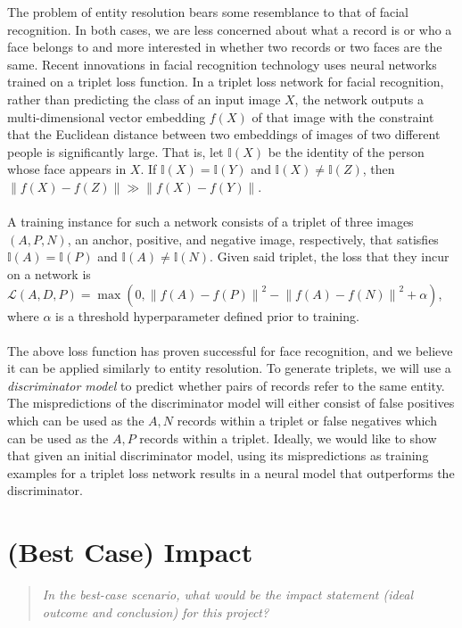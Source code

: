 \documentclass{proc}
\begin{document}
The problem of entity resolution bears some resemblance to that of facial recognition. In both cases, we are less concerned about what a record is or who a face belongs to and more interested in whether two records or two faces are the same. Recent innovations in facial recognition technology uses neural networks trained on a triplet loss function. In a triplet loss network for facial recognition, rather than predicting the class of an input image $X$, the network outputs a multi-dimensional vector embedding $f(X)$ of that image with the constraint that the Euclidean distance between two embeddings of images of two different people is significantly large. That is, let $\mathbb{I}(X)$ be the identity of the person whose face appears in $X$. If $\mathbb{I}(X) = \mathbb{I}(Y)$ and $\mathbb{I}(X) \neq \mathbb{I}(Z)$, then $\left\|f(X) - f(Z) \right\|  \gg \left\|f(X) - f(Y) \right\|$.
\\\\
A training instance for such a network consists of a triplet of three images $(A, P, N)$, an anchor, positive, and negative image, respectively, that satisfies $\mathbb{I}(A) = \mathbb{I}(P)$ and $\mathbb{I}(A) \neq \mathbb{I}(N)$. Given said triplet, the loss that they incur on a network is $\mathcal{L}(A, D, P) = \max(0, \left\|f(A) - f(P) \right\|^2 - \left\|f(A) - f(N) \right\|^2 + \alpha)$, where $\alpha$ is a threshold hyperparameter defined prior to training.
\\\\
The above loss function has proven successful for face recognition, and we believe it can be applied similarly to entity resolution. To generate triplets,  we will use a \emph{discriminator model} to predict whether pairs of records refer to the same entity. The mispredictions of the discriminator model will either consist of false positives which can be used as the $A, N$ records within a triplet or false negatives which can be used as the $A, P$  records within a triplet. Ideally, we would like to show that given an initial discriminator model, using its mispredictions as training examples for a triplet loss network results in a neural model that outperforms the discriminator.

\section{(Best Case) Impact}
\begin{quote}
\emph{In the best-case scenario, what would be the impact statement (ideal outcome and conclusion) for this project?} 
\end{quote}
\end{document}

